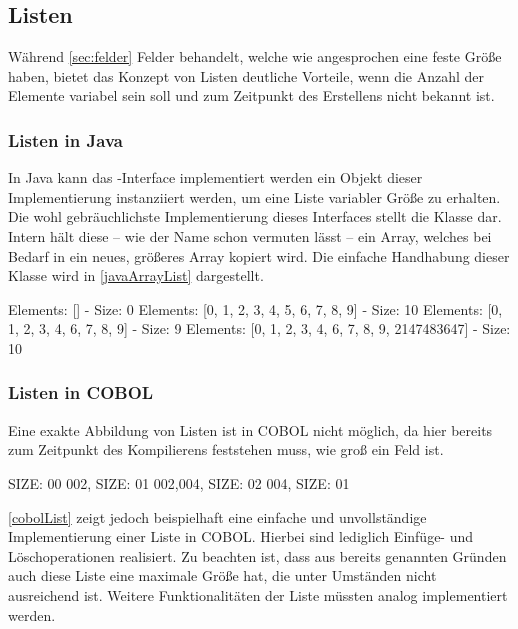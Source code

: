 \subsection{Listen}\label{lists}
Während \autoref{sec:felder} Felder behandelt, welche wie angesprochen eine feste Größe haben, bietet das Konzept von Listen deutliche Vorteile, wenn die Anzahl der Elemente variabel sein soll und zum Zeitpunkt des Erstellens nicht bekannt ist.
\subsubsection*{Listen in Java}
In Java kann das -Interface implementiert werden \bzw ein Objekt dieser Implementierung instanziiert werden, um eine Liste variabler Größe zu erhalten. Die wohl gebräuchlichste Implementierung dieses Interfaces stellt die Klasse  dar. Intern hält diese -- wie der Name schon vermuten lässt -- ein Array, welches bei Bedarf in ein neues, größeres Array kopiert wird. Die einfache Handhabung dieser Klasse wird in  \autoref{javaArrayList} dargestellt.
\begin{shellwindow}
Elements: [] - Size: 0
Elements: [0, 1, 2, 3, 4, 5, 6, 7, 8, 9] - Size: 10
Elements: [0, 1, 2, 3, 4, 6, 7, 8, 9] - Size: 9
Elements: [0, 1, 2, 3, 4, 6, 7, 8, 9, 2147483647] - Size: 10
\end{shellwindow}
\subsubsection*{Listen in COBOL}
Eine exakte Abbildung von Listen ist in COBOL nicht möglich, da hier bereits zum Zeitpunkt des Kompilierens feststehen muss, wie groß ein Feld ist.
\begin{shellwindow}
 SIZE: 00
002, SIZE: 01
002,004, SIZE: 02
004, SIZE: 01
\end{shellwindow}
\autoref{cobolList} zeigt jedoch beispielhaft eine einfache und unvollständige Implementierung einer Liste in COBOL. Hierbei sind lediglich Einfüge- und Löschoperationen realisiert. Zu beachten ist, dass aus bereits genannten Gründen auch diese Liste eine maximale Größe hat, die unter Umständen nicht ausreichend ist. Weitere Funktionalitäten der Liste müssten analog implementiert werden.